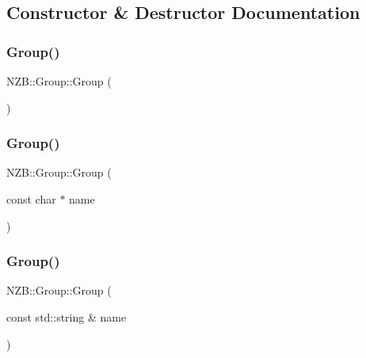 \subsection{Constructor \& Destructor Documentation}
\hypertarget{class_n_z_b_1_1_group_ab799deb858fbbbdf6cdfb8bb1814b015}{}\label{class_n_z_b_1_1_group_ab799deb858fbbbdf6cdfb8bb1814b015} 
\subsubsection{\texorpdfstring{Group()}{Group()}\hspace{0.1cm}{\footnotesize\ttfamily [1/5]}}
{\footnotesize\ttfamily N\+Z\+B\+::\+Group\+::\+Group (\begin{DoxyParamCaption}{ }\end{DoxyParamCaption})\hspace{0.3cm}{\ttfamily [inline]}}

\hypertarget{class_n_z_b_1_1_group_a59f8f83b74d872880d0582ad56bcce64}{}\label{class_n_z_b_1_1_group_a59f8f83b74d872880d0582ad56bcce64} 
\subsubsection{\texorpdfstring{Group()}{Group()}\hspace{0.1cm}{\footnotesize\ttfamily [2/5]}}
{\footnotesize\ttfamily N\+Z\+B\+::\+Group\+::\+Group (\begin{DoxyParamCaption}\item[{const char $\ast$}]{name }\end{DoxyParamCaption})\hspace{0.3cm}{\ttfamily [inline]}}

\hypertarget{class_n_z_b_1_1_group_a929441831526bd1bd7b8e5dac6794fac}{}\label{class_n_z_b_1_1_group_a929441831526bd1bd7b8e5dac6794fac} 
\subsubsection{\texorpdfstring{Group()}{Group()}\hspace{0.1cm}{\footnotesize\ttfamily [3/5]}}
{\footnotesize\ttfamily N\+Z\+B\+::\+Group\+::\+Group (\begin{DoxyParamCaption}\item[{const std\+::string \&}]{name }\end{DoxyParamCaption})\hspace{0.3cm}{\ttfamily [inline]}}

